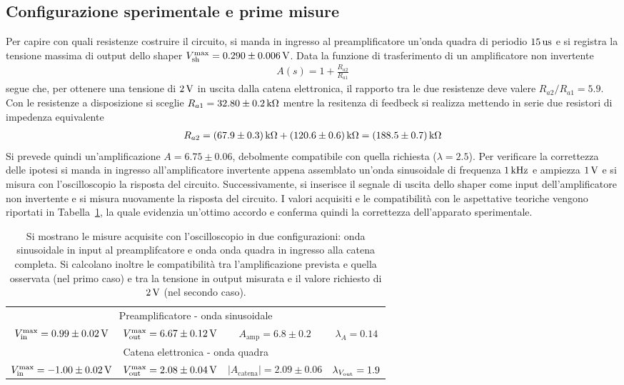 \subsection{Configurazione sperimentale e prime misure}\label{sec:catena_config}
Per capire con quali resistenze costruire il circuito, si manda in ingresso
al preamplificatore un'onda quadra di periodio $15\us$ e si registra la
tensione massima di output dello shaper $V_{\text{sh}}^{\text{max}}=0.290\pm 0.006\V$.
Data la funzione di trasferimento di un amplificatore non invertente
\begin{align}
  A(s)=1+\frac{R_{a2}}{R_{a1}}
\end{align}
segue che, per ottenere una tensione di $2\V$ in uscita dalla catena elettronica, il rapporto tra le due resistenze deve valere $R_{a2}/R_{a1}=5.9$. Con le resistenze a disposizione si sceglie
$R_{a1}=32.80\pm 0.2\kOhm$ mentre la resitenza di feedbeck si realizza mettendo in serie
due resistori di impedenza equivalente
\begin{align}
  R_{a2}= (67.9\pm 0.3)\kOhm + (120.6 \pm 0.6)\kOhm = (188.5 \pm 0.7)\kOhm
\end{align}
Si prevede quindi un'amplificazione $A=6.75\pm 0.06$, debolmente compatibile con quella richiesta ($\lambda=2.5$). Per verificare la correttezza delle ipotesi si manda in ingresso all'amplificatore invertente appena
assemblato un'onda sinusoidale di frequenza $1\kHz$ e ampiezza $1\V$ e
si misura con l'oscilloscopio la risposta del circuito. Successivamente, si
inserisce il segnale di uscita dello shaper come input dell'amplificatore non
invertente e si misura nuovamente la risposta del circuito. I valori acquisiti e le compatibilità con le aspettative teoriche vengono riportati in
Tabella~\ref{tab:amp_misure}, la quale evidenzia un'ottimo accordo e conferma quindi
la correttezza dell'apparato sperimentale.
\begin{table}[h]
\renewcommand{\arraystretch}{1.6}
\centering
\setlength{\tabcolsep}{10pt}
\begin{tabular}{ |cccc| }
\hline
\multicolumn{4}{|c|}{Preamplificatore - onda sinusoidale} \\
$V_{\inp}^{\text{max}}=0.99\pm 0.02\V$ & $V_{\out}^{\text{max}}=6.67\pm 0.12\V$ & $A_{\text{amp}}=6.8\pm 0.2$ & $ \lambda_{A}=0.14$\\
\hline
\multicolumn{4}{|c|}{Catena elettronica - onda quadra} \\
$V_{\inp}^{\text{max}}=-1.00\pm 0.02\V$ & $V_{\out}^{\text{max}}=2.08\pm 0.04\V$ &$|A_{\text{catena}}|=2.09\pm 0.06$ & $\lambda_{V_{\out}}=1.9$ \\
\hline
\end{tabular}
\caption{\footnotesize Si mostrano le misure acquisite con l'oscilloscopio in due configurazioni: onda sinusoidale in input al preamplifcatore e onda onda quadra in  ingresso alla catena completa. Si calcolano inoltre le compatibilità tra l'amplificazione prevista e quella osservata (nel primo caso) e tra la tensione in output misurata e il valore richiesto di $2\V$ (nel secondo caso).}\label{tab:amp_misure}
\end{table}


